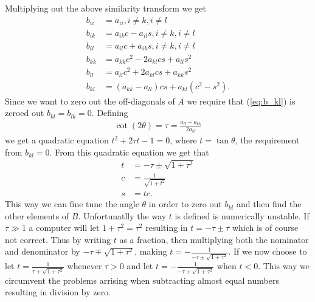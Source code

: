\documentclass[twocolumn]{aastex62}
\begin{document}
Multiplying out the above similarity transform we get 
\begin{align}
	b_{ii} &= a_{ii} , i\neq k, i\neq l\\
	b_{ik} &= a_{ik}c - a_{il}s, i\neq k, i\neq l\\
	b_{il} &= a_{il}c + a_{ik}s, i\neq k, i\neq l\\
	b_{kk} &= a_{kk}c^2 - 2a_{kl}cs + a_{ll}s^2\\
	b_{ll} &= a_{ll}c^2 + 2a_{kl}cs + a_{kk}s^2\\
	b_{kl} &= (a_{kk} - a_{ll})cs + a_{kl}(c^2 - s^2).
	\label{eq:b_kl}
\end{align}
Since we want to zero out the off-diagonals of $A$ we require that (\ref{eq:b_kl}) is zeroed out $b_{kl} = b_{lk} = 0$. Defining 
\begin{align}
	\cot(2\theta) = \tau = \frac{a_{ll} - a_{kk}}{2a_{kl}}
\end{align}
we get a quadratic equation $t^2 + 2\tau t - 1 = 0$, where $t = \tan \theta$, the requirement from $b_{kl} = 0$. From this quadratic equation we get that 
\begin{align}
	t &= -\tau \pm \sqrt{1+\tau^2}\\
	c & = \frac{1}{\sqrt{1+t^2}}\\
	s &= tc.
\end{align}
This way we can fine tune the angle $\theta$ in order to zero out $b_{kl}$ and then find the other elements of $B$.  Unfortunatlly the way $t$ is defined is numerically unstable. If $\tau\gg1$ a computer will let $1+\tau^2 = \tau^2$ resulting in $t = -\tau \pm \tau$ which is of course not correct. Thus by writing $t$ as a fraction, then multiplying both the nominator and denominator by $-\tau\mp\sqrt{1+\tau^2}$, making $t = -\frac{1}{-\tau \pm \sqrt{1 + \tau^2}}$. If we now choose to let $t = \frac{1}{\tau + \sqrt{1 + \tau^2}}$ whenever $\tau>0$ and let $t = -\frac{1}{-\tau + \sqrt{1+\tau^2}}$ when $t<0$. This way we circumvent the problems arrising when subtracting almost equal numbers resulting in division by zero.
\end{document}
